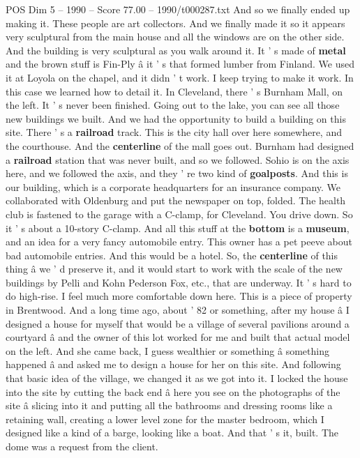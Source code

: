 \begin{textsample}{POS Dim 5 – 1990 – Score 77.00 – 1990/t000287.txt}
And so we finally ended up making it.
These people are art collectors.
And we finally made it so it appears very sculptural from the main house and all the windows are on the other side.
And the building is very sculptural as you walk around it.
It ' s made of \textbf{metal} and the brown stuff is Fin-Ply â it ' s that formed lumber from Finland.
We used it at Loyola on the chapel, and it didn ' t work.
I keep trying to make it work.
In this case we learned how to detail it.
In Cleveland, there ' s Burnham Mall, on the left.
It ' s never been finished.
Going out to the lake, you can see all those new buildings we built.
And we had the opportunity to build a building on this site.
There ' s a \textbf{railroad} track.
This is the city hall over here somewhere, and the courthouse.
And the \textbf{centerline} of the mall goes out.
Burnham had designed a \textbf{railroad} station that was never built, and so we followed.
Sohio is on the axis here, and we followed the axis, and they ' re two kind of \textbf{goalposts}.
And this is our building, which is a corporate headquarters for an insurance company.
We collaborated with Oldenburg and put the newspaper on top, folded.
The health club is fastened to the garage with a C-clamp, for Cleveland.
You drive down.
So it ' s about a 10-story C-clamp.
And all this stuff at the \textbf{bottom} is a \textbf{museum}, and an idea for a very fancy automobile entry.
This owner has a pet peeve about bad automobile entries.
And this would be a hotel.
So, the \textbf{centerline} of this thing â we ' d preserve it, and it would start to work with the scale of the new buildings by Pelli and Kohn Pederson Fox, etc., that are underway.
It ' s hard to do high-rise.
I feel much more comfortable down here.
This is a piece of property in Brentwood.
And a long time ago, about ' 82 or something, after my house â I designed a house for myself that would be a village of several pavilions around a courtyard â and the owner of this lot worked for me and built that actual model on the left.
And she came back, I guess wealthier or something â something happened â and asked me to design a house for her on this site.
And following that basic idea of the village, we changed it as we got into it.
I locked the house into the site by cutting the back end â here you see on the photographs of the site â slicing into it and putting all the bathrooms and dressing rooms like a retaining wall, creating a lower level zone for the master bedroom, which I designed like a kind of a barge, looking like a boat.
And that ' s it, built.
The dome was a request from the client.

\end{textsample}
